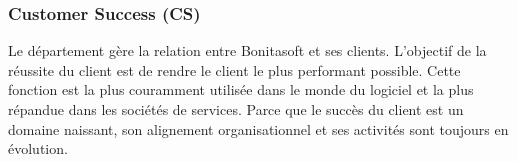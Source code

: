 \subsubsection{Customer Success (CS)}
Le département gère la relation entre Bonitasoft et ses clients. L'objectif de la réussite du client est de rendre le client le plus performant possible.
Cette fonction est la plus couramment utilisée dans le monde du logiciel et la plus répandue dans les sociétés de services. Parce que le succès du client est un domaine naissant, son alignement organisationnel et ses activités sont toujours en évolution.
